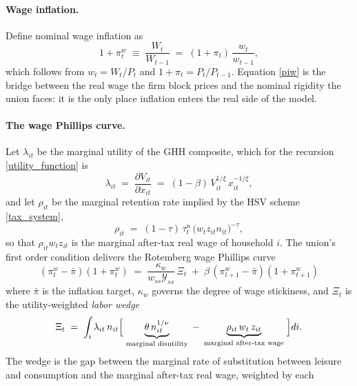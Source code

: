 \paragraph{Wage inflation.} Define nominal wage inflation as
\begin{equation}\label{piw}
  1+\pi^w_t \;\equiv\; \frac{W_t}{W_{t-1}} \;=\; (1+\pi_t)\,\frac{w_t}{w_{t-1}},
\end{equation}
which follows from $w_t = W_t/P_t$ and $1+\pi_t = P_t/P_{t-1}$. Equation
\eqref{piw} is the bridge between the real wage the firm block prices and the
nominal rigidity the union faces: it is the only place inflation enters the real
side of the model.

\paragraph{The wage Phillips curve.} Let $\lambda_{it}$ be the marginal utility
of the GHH composite, which for the recursion \eqref{utility_function} is
\begin{equation}\label{lambda}
  \lambda_{it} \;=\; \frac{\partial V_{it}}{\partial x_{it}}
  \;=\; (1-\beta)\, V_{it}^{1/\xi}\, x_{it}^{-1/\xi},
\end{equation}
and let $\rho_{it}$ be the marginal retention rate implied by the HSV scheme
\eqref{tax_system},
\begin{equation}\label{rho}
  \rho_{it} \;=\; (1-\tau)\,\tau^n_t\,\bigl(w_t z_{it} n_{it}\bigr)^{-\tau},
\end{equation}
so that $\rho_{it} w_t z_{it}$ is the marginal after-tax real wage of household
$i$. The union's first order condition delivers the Rotemberg wage Phillips
curve
\begin{equation}\label{nkpc}
  \boxed{\;(\pi^w_t - \bar\pi)(1+\pi^w_t)
  \;=\; \frac{\kappa_w}{w_{ss}\mathcal{Y}_{ss}}\,\Xi_t
  \;+\; \beta\,(\pi^w_{t+1} - \bar\pi)(1+\pi^w_{t+1})\;}
\end{equation}
where $\bar\pi$ is the inflation target, $\kappa_w$ governs the degree of wage
stickiness, and $\Xi_t$ is the utility-weighted \emph{labor wedge}
\begin{equation}\label{wedge}
  \Xi_t \;=\; \int_i \lambda_{it}\, n_{it}
      \Bigl[\;\underbrace{\theta\, n_{it}^{1/\nu}}_{\text{marginal disutility}}
      \;-\; \underbrace{\rho_{it}\, w_t\, z_{it}}_{\text{marginal after-tax wage}}\;\Bigr] di .
\end{equation}
The wedge is the gap between the marginal rate of substitution between leisure
and consumption and the marginal after-tax real wage, weighted by each
